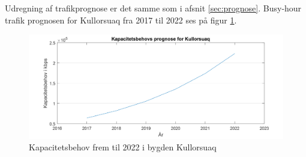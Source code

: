 Udregning af trafikprognose er det samme som i afsnit \ref{sec:prognose}. Busy-hour trafik prognosen for Kullorsuaq fra 2017 til 2022 ses på figur \ref{fig:kapBehovKullorsuaq}.
\begin{figure}[!h]
	\centering
	\includegraphics[width=1\textwidth]{figure/kapBehovKullorsuaq.pdf}
	\caption{Kapacitetsbehov frem til 2022 i bygden Kullorsuaq}
	\label{fig:kapBehovKullorsuaq}
\end{figure}

%
